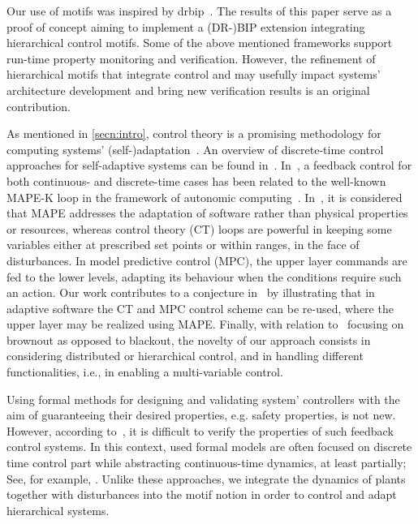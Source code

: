 \documentclass[runningheads]{llncs}
\makeatletter
\newcommand{\secn}[1]{\cref{secn:#1}}
\newcommand{\eg}[1][\@ ]{e.g.{#1}}
\makeatother
\begin{document}
Our use of motifs was inspired by \gls{drbip}~\cite{ballouliBBS18}.  
The results of this paper serve as a proof of concept aiming to implement a (DR-)BIP extension integrating hierarchical control motifs.
Some of the above mentioned frameworks support run-time property monitoring and verification. However, the refinement of hierarchical motifs that integrate control and may usefully impact systems' architecture development and bring new verification results is an original contribution.%


As mentioned in \secn{intro}, control theory is a promising methodology for computing systems' (self-)adaptation~\cite{hellerstein2004feedback,filieri2015software}. 
An overview of discrete-time control approaches for self-adaptive systems can be found in~\cite{LemosGGGALSWBBB13}. In~\cite{RuttenMS13}, a feedback control for both continuous- and discrete-time cases has been related to the well-known MAPE-K loop in the framework of autonomic computing~\cite{kephartC03}. 
In~\cite{weynsSKLLOPT21}, it is considered that MAPE addresses the adaptation of software rather than physical properties or resources, whereas control theory (CT) loops are powerful in keeping some variables either at prescribed set points or within ranges, in the face of disturbances. In model predictive control (MPC), the upper layer commands are fed to the lower levels, adapting its behaviour when the conditions require such an action.  
Our work contributes to a conjecture in~\cite{weynsSKLLOPT21} by illustrating that in adaptive software the CT and MPC control scheme can be re-used, where the upper layer may be realized using MAPE. 
Finally, with relation to~\cite{kleinMAH14} focusing on brownout as opposed to blackout, the novelty of our approach consists in considering distributed or hierarchical control, and in handling different functionalities, i.e., in enabling a multi-variable control.

Using formal methods for designing and validating system' controllers with the aim of guaranteeing their desired properties, \eg[] safety properties, is not new. However, according to~\cite{dutta-learning-2018}, it is difficult to verify the properties of such feedback control systems. 
In this context, used formal models are often focused on discrete time control part while abstracting continuous-time dynamics, at least partially; See, for example, \cite{balakrishnan-Refining-2009,arechiga-using-2012}. 
Unlike these approaches, we integrate the dynamics of plants together with disturbances into the motif notion in order to control and adapt hierarchical systems.
\end{document}
